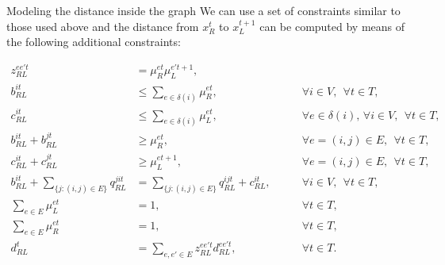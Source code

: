 \documentclass[slidestop,usepdftitle=false,10pt]{beamer}
\begin{document}
    \begin{frame}{Modeling the distance inside the graph}
	 We can use a set of constraints similar to those used above and the distance from $x_R^t$ to $x_L^{t+1}$ can be computed by means of the following additional constraints:
	\begin{tiny}
	{\color{red}
    \begin{align}
        z_{RL}^{ee't} & = \mu_{R}^{et}\mu_{L}^{e't+1},\label{st1:prodRL}\\
        b_{RL}^{it} & \leq \sum_{e\in\delta(i)}\mu_{R}^{et}, \label{st1:bRt1}&\qquad \forall i\in V,\:\:  \forall t \in T, \\
        c_{RL}^{it} & \leq \sum_{e\in\delta(i)}\mu_{L}^{et}, \label{st1:cRt1}&\qquad \forall e\in\delta(i),\,\forall i\in V, \:\:  \forall t \in T,\\
        b_{RL}^{it} + b_{RL}^{jt} & \geq \mu_R^{et}, &\qquad \forall e=(i, j)\in E, \:\:  \forall t \in T, \label{st1:bRt2}\\
        c_{RL}^{it} + c_{RL}^{jt} & \geq \mu_L^{et+1}, &\qquad \forall e=(i, j)\in E, \:\:  \forall t \in T, \label{st1:cRt2}\\
        b_{RL}^{it} + \sum_{\{j:(i, j)\in E\}} q_{RL}^{jit} & = \sum_{\{j:(i, j)\in E\}} q_{RL}^{ijt} +  c_{RL}^{it}, \label{st1:flow}&\qquad \forall i \in V, \:\:  \forall t \in T, \\
        \sum_{e\in E} \mu_{L}^{et} & = 1,  &\qquad \forall t \in T, \label{st1:muLe} \\
        \sum_{e\in E} \mu_{R}^{et} & = 1, &\qquad \forall t \in T, \label{st1:muRe}\\
        d_{RL}^t & = \sum_{e, e'\in E} z_{RL}^{ee't} d_{RL}^{ee't}, &\qquad \forall t \in T. \label{st1:dRLtN}
    \end{align}}
    \end{tiny}
    \end{frame}	
	
\end{document}
